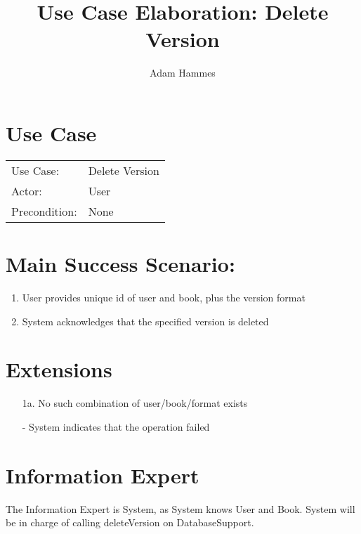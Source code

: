 \documentclass{article}
\title{Use Case Elaboration: Delete Version}
\author{ Adam Hammes }
\begin{document}
\maketitle


\section*{Use Case}
\begin{tabular}{l l}
Use Case:     & Delete Version\\
Actor:        & User\\
Precondition: & None\\
\end{tabular}


\section*{Main Success Scenario:}

\begin{enumerate}
    \item User provides unique id of user and book, plus the version format
    \item System acknowledges that the specified version is deleted

\end{enumerate}

\section*{Extensions}

\begin{itemize}
    \item [1a.] No such combination of user/book/format exists
                
    - System indicates that the operation failed

\end{itemize}


\section*{Information Expert}

The Information Expert is System, as System knows User and Book.
System will be in charge of calling deleteVersion on DatabaseSupport.
\end{document}
